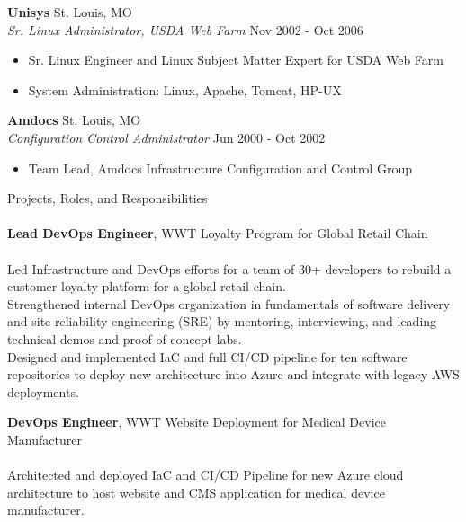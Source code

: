 \documentclass[letterpaper]{article}
\newcommand{\lineunder} {
    \vspace*{-8pt} \\
    \hspace*{-18pt} \hrulefill \\
}
\newcommand{\header} [1] {
    {\hspace*{-18pt}\vspace*{6pt} #1}
    \vspace*{-6pt} \lineunder
}
\begin{document}
\textbf{Unisys} \hfill St. Louis, MO\\
\textit{Sr. Linux Administrator, USDA Web Farm} \hfill Nov 2002 - Oct 2006\\
\vspace{-1mm}
\begin{itemize}
	\item Sr. Linux Engineer and Linux Subject Matter Expert for USDA Web Farm
	\item System Administration: Linux, Apache, Tomcat, HP-UX
\end{itemize}

\textbf{Amdocs} \hfill St. Louis, MO\\
\textit{Configuration Control Administrator} \hfill Jun 2000 - Oct 2002\\
\vspace{-1mm}
\begin{itemize}
	\item Team Lead, Amdocs Infrastructure Configuration and Control Group
\end{itemize}

\pagebreak

\header{Projects, Roles, and Responsibilities}

{\textbf{Lead DevOps Engineer}, WWT Loyalty Program for Global Retail Chain} \\
\hspace{5mm}{\sl (Terraform, Microsoft Azure, Azure DevOps, Amazon AWS)} \\
Led Infrastructure and DevOps efforts for a team of 30+ developers to rebuild
  a customer loyalty platform for a global retail chain. \\
Strengthened internal DevOps organization in fundamentals of software delivery and
  site reliability engineering (SRE) by mentoring, interviewing, and leading
  technical demos and proof-of-concept labs.\\
Designed and implemented IaC and full CI/CD pipeline for ten software
  repositories to deploy new architecture into Azure and integrate with legacy
  AWS deployments.\\
\vspace*{2mm}

{\textbf{DevOps Engineer}, WWT Website Deployment for Medical Device Manufacturer} \\
\hspace{5mm}{\sl (Terraform, Ansible, Microsoft Azure, Azure DevOps)} \\
Architected and deployed IaC and CI/CD Pipeline for new Azure cloud
  architecture to host website and CMS application for medical device
  manufacturer.\\
\vspace*{2mm}
\end{document}
